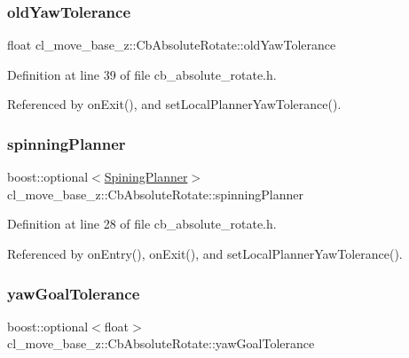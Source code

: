 \subsubsection{\texorpdfstring{old\+Yaw\+Tolerance}{oldYawTolerance}}
{\footnotesize\ttfamily float cl\+\_\+move\+\_\+base\+\_\+z\+::\+Cb\+Absolute\+Rotate\+::old\+Yaw\+Tolerance\hspace{0.3cm}{\ttfamily [private]}}



Definition at line 39 of file cb\+\_\+absolute\+\_\+rotate.\+h.



Referenced by on\+Exit(), and set\+Local\+Planner\+Yaw\+Tolerance().

\mbox{\label{classcl__move__base__z_1_1CbAbsoluteRotate_a17d836524599af072cf2e3488e491a91}} 
\subsubsection{\texorpdfstring{spinning\+Planner}{spinningPlanner}}
{\footnotesize\ttfamily boost\+::optional$<$\hyperlink{classcl__move__base__z_1_1CbAbsoluteRotate_ab8d45e43594a3fc6a71c08f07b5dbef0}{Spining\+Planner}$>$ cl\+\_\+move\+\_\+base\+\_\+z\+::\+Cb\+Absolute\+Rotate\+::spinning\+Planner}



Definition at line 28 of file cb\+\_\+absolute\+\_\+rotate.\+h.



Referenced by on\+Entry(), on\+Exit(), and set\+Local\+Planner\+Yaw\+Tolerance().

\mbox{\label{classcl__move__base__z_1_1CbAbsoluteRotate_a8d8b5b9c2c821efe101bb07c96c4bdd3}} 
\subsubsection{\texorpdfstring{yaw\+Goal\+Tolerance}{yawGoalTolerance}}
{\footnotesize\ttfamily boost\+::optional$<$float$>$ cl\+\_\+move\+\_\+base\+\_\+z\+::\+Cb\+Absolute\+Rotate\+::yaw\+Goal\+Tolerance}



